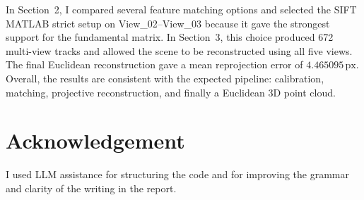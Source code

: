 \documentclass[11pt,a4paper]{article}
\begin{document}
In Section~2, I compared several feature matching options and selected the SIFT MATLAB
strict setup on View\_02--View\_03 because it gave the strongest support for the
fundamental matrix. In Section~3, this choice produced 672 multi-view tracks and allowed
the scene to be reconstructed using all five views. The final Euclidean reconstruction
gave a mean reprojection error of $4.465095\,\mathrm{px}$. Overall, the results are
consistent with the expected pipeline: calibration, matching, projective reconstruction,
and finally a Euclidean 3D point cloud.

\section*{Acknowledgement}

I used LLM assistance for structuring the code and for improving the grammar and clarity of the writing in the report.
\end{document}

